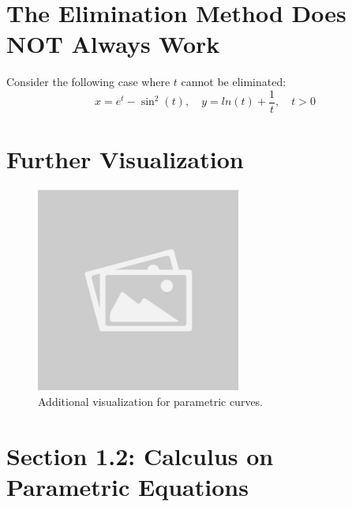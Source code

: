 \documentclass{article}
\begin{document}
\section*{The Elimination Method Does NOT Always Work}
\begin{notebox}
Consider the following case where \( t \) cannot be eliminated:
\[
    x = e^t - \sin^2(t), \quad y = ln(t) + \frac{1}{t}, \quad t > 0
\]
\end{notebox}

\section*{Further Visualization}
\begin{figure}[H]
    \centering
    \includegraphics[width=0.6\textwidth]{sample_image2.jpg}
    \caption{Additional visualization for parametric curves.}
    \label{fig:sample_image2}
\end{figure}

\section*{Section 1.2: Calculus on Parametric Equations}
\end{document}
